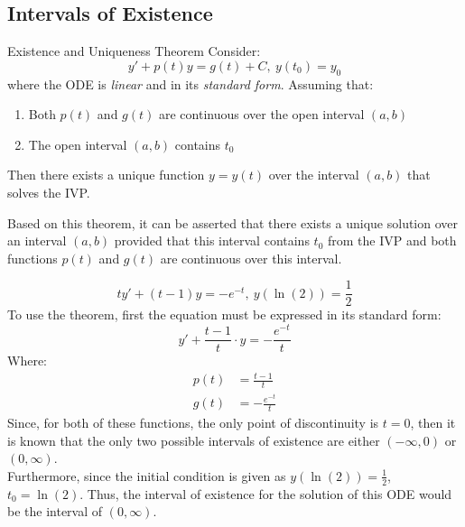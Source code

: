 \documentclass[12pt]{article}
\begin{document}
\subsection{Intervals of Existence}
\label{ssec:intervalsOfExistence}

\begin{definition}{Existence and Uniqueness Theorem}
  Consider:
  \begin{equation*}
    y' + p(t)y = g(t) + C,\ y(t_0) = y_0
  \end{equation*}
  where the ODE is \textit{linear} and in its \textit{standard form}.
  Assuming that:
  \begin{enumerate}
    \itemsep-0.15em
    \item Both $p(t)$ and $g(t)$ are continuous over the open interval $(a,b)$
    \item The open interval $(a,b)$ contains $t_0$
  \end{enumerate}
  Then there exists a unique function $y = y(t)$ over the interval $(a,b)$ that solves the IVP.
\end{definition}

Based on this theorem, it can be asserted that there exists a unique solution over an interval $(a,b)$ provided that this interval contains $t_0$ from the IVP and both functions $p(t)$ and $g(t)$ are continuous over this interval.

\begin{example}
  \begin{equation*}
    ty' + (t-1)y = -e^{-t},\ y\left(\ln(2)\right) = \frac{1}{2}
  \end{equation*}
  To use the theorem, first the equation must be expressed in its standard form:
  \begin{equation*}
    y' + \frac{t-1}{t}\cdot y = -\frac{e^{-t}}{t}
  \end{equation*}
  Where:
  \begin{align*}
    p(t) &= \frac{t-1}{t} \\
    g(t) &= -\frac{e^{-t}}{t}
  \end{align*}
  Since, for both of these functions, the only point of discontinuity is $t=0$, then it is known that the only two possible intervals of existence are either $(-\infty,0)$ or $(0,\infty)$. \\

  Furthermore, since the initial condition is given as $y\left(\ln(2)\right) = \frac{1}{2}$, $t_0 = \ln(2)$. Thus, the interval of existence for the solution of this ODE would be the interval of $(0,\infty)$.
\end{example}
\end{document}
